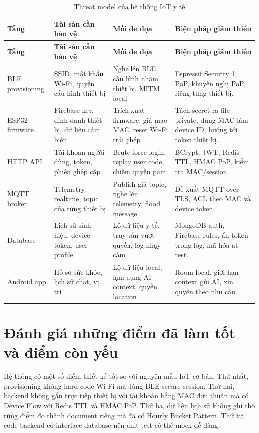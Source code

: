 \documentclass[a4paper,13pt,3p,oneside]{report}
\begin{document}
\begin{longtable}{
p{}
p{}
p{}
p{}
}
\caption{Threat model của hệ thống IoT y tế}\\
\toprule
\textbf{Tầng} & \textbf{Tài sản cần bảo vệ} & \textbf{Mối đe dọa} & \textbf{Biện pháp giảm thiểu} \\
\midrule
\endfirsthead

\toprule
\textbf{Tầng} & \textbf{Tài sản cần bảo vệ} & \textbf{Mối đe dọa} & \textbf{Biện pháp giảm thiểu} \\
\midrule
\endhead

BLE provisioning & SSID, mật khẩu Wi-Fi, quyền cấu hình thiết bị & Nghe lén BLE, cấu hình nhầm thiết bị, MITM local & Espressif Security 1, PoP, khuyến nghị PoP riêng từng thiết bị. \\
ESP32 firmware & Firebase key, định danh thiết bị, dữ liệu cảm biến & Trích xuất firmware, giả mạo MAC, reset Wi-Fi trái phép & Tách secret ra file private, dùng MAC làm device ID, hướng tới token thiết bị. \\
HTTP API & Tài khoản người dùng, token, phiên ghép cặp & Brute-force login, replay user code, chiếm quyền pair & BCrypt, JWT, Redis TTL, HMAC PoP, kiểm tra MAC/session. \\
MQTT broker & Telemetry realtime, topic của từng thiết bị & Publish giả topic, nghe lén telemetry, flood message & Đề xuất MQTT over TLS, ACL theo MAC và device token. \\
Database & Lịch sử sinh hiệu, device token, user profile & Lộ dữ liệu y tế, truy vấn vượt quyền, log nhạy cảm & MongoDB auth, Firebase rules, ẩn token trong log, mã hóa at-rest. \\
Android app & Hồ sơ sức khỏe, lịch sử chat, vị trí & Lộ dữ liệu local, lạm dụng AI context, quyền location & Room local, giới hạn context gửi AI, xin quyền theo nhu cầu. \\

\bottomrule
\end{longtable}

\begin{landscape}
\end{landscape}

\section{Đánh giá những điểm đã làm tốt và điểm còn yếu}
Hệ thống có một số điểm thiết kế tốt so với nguyên mẫu IoT cơ bản. Thứ nhất, provisioning không hard-code Wi-Fi mà dùng BLE secure session. Thứ hai, backend không gắn trực tiếp thiết bị với tài khoản bằng MAC đơn thuần mà có Device Flow với Redis TTL và HMAC PoP. Thứ ba, dữ liệu lịch sử không ghi thô từng điểm đo thành document riêng mà đã có Hourly Bucket Pattern. Thứ tư, code backend có interface database nên unit test có thể mock dễ dàng.
\end{document}
